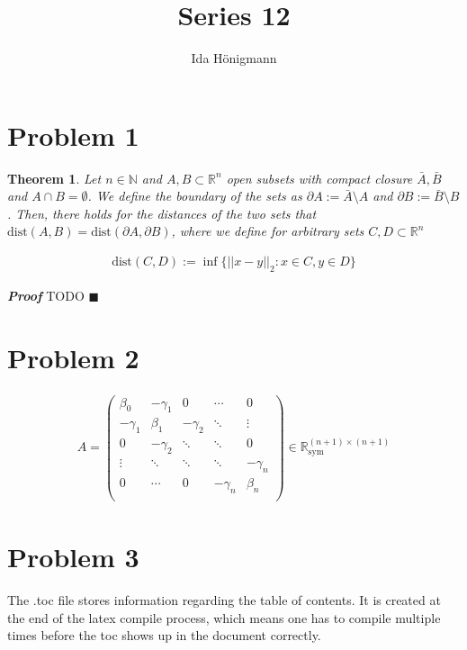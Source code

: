 \documentclass[12pt]{article}
\title{Series 12}
\author{Ida Hönigmann}
\newtheorem{theorem}{Theorem}
\newenvironment{proof}{\textit{\textbf{Proof}}}{\hfill$\blacksquare$}
\newcommand{\norm}[1]{||{#1}||_2}
\newcommand{\dist}[2]{\textrm{dist}({#1}, {#2})}
\begin{document}
\maketitle

\tableofcontents

\section{Problem 1}
\begin{theorem}
	Let $n \in \mathbb{N}$ and $A, B \subset \mathbb{R}^n$ open subsets with compact closure $\bar{A}, \bar{B}$ and $A \cap B = \emptyset$.
	We define the boundary of the sets as $\partial A := \bar{A} \setminus A$ and $\partial B := \bar{B} \setminus B$.
	Then, there holds for the distances of the two sets that $\dist{A}{B} = \dist{\partial A}{\partial B}$, where we define for arbitrary sets $C, D \subset \mathbb{R}^n$
	
	\begin{align}
		\dist{C}{D} := \inf \{\norm{x - y} : x \in C, y \in D\}
	\end{align}
\end{theorem}

\begin{proof}
	TODO
\end{proof}

\section{Problem 2}
\begin{align*}
	A = \left(
	\begin{array}{ccccc}
		\beta_0   & -\gamma_1 & 0         & \cdots    & 0        \\
		-\gamma_1 & \beta_1   & -\gamma_2 & \ddots    & \vdots   \\
		0         & -\gamma_2 & \ddots    & \ddots    & 0        \\
		\vdots    & \ddots    & \ddots    & \ddots    & -\gamma_n\\
		0         & \cdots    & 0         & -\gamma_n & \beta_n  \\
	\end{array}
	\right) \in \mathbb{R}^{(n+1)\times (n+1)}_{\textrm{sym}}
\end{align*}

\section{Problem 3}
The .toc file stores information regarding the table of contents. It is created at the end of the latex compile process, which means one has to compile multiple times before the toc shows up in the document correctly.
\end{document}
